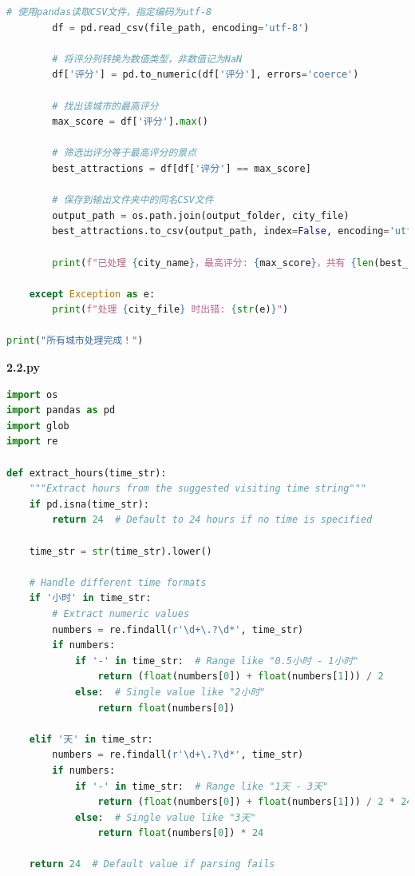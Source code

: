 \documentclass[withoutpreface,bwprint]{cumcmthesis} %
\begin{document}
\begin{appendices}
\begin{lstlisting}[language=python]
        # 使用pandas读取CSV文件，指定编码为utf-8
        df = pd.read_csv(file_path, encoding='utf-8')
        
        # 将评分列转换为数值类型，非数值记为NaN
        df['评分'] = pd.to_numeric(df['评分'], errors='coerce')
        
        # 找出该城市的最高评分
        max_score = df['评分'].max()
        
        # 筛选出评分等于最高评分的景点
        best_attractions = df[df['评分'] == max_score]
        
        # 保存到输出文件夹中的同名CSV文件
        output_path = os.path.join(output_folder, city_file)
        best_attractions.to_csv(output_path, index=False, encoding='utf-8')
        
        print(f"已处理 {city_name}，最高评分: {max_score}，共有 {len(best_attractions)} 个最高评分景点")
    
    except Exception as e:
        print(f"处理 {city_file} 时出错: {str(e)}")

print("所有城市处理完成！")

 \end{lstlisting}




 \textbf{2.2.py}
\begin{lstlisting}[language=python]
import os
import pandas as pd
import glob
import re

def extract_hours(time_str):
    """Extract hours from the suggested visiting time string"""
    if pd.isna(time_str):
        return 24  # Default to 24 hours if no time is specified
    
    time_str = str(time_str).lower()
    
    # Handle different time formats
    if '小时' in time_str:
        # Extract numeric values
        numbers = re.findall(r'\d+\.?\d*', time_str)
        if numbers:
            if '-' in time_str:  # Range like "0.5小时 - 1小时"
                return (float(numbers[0]) + float(numbers[1])) / 2
            else:  # Single value like "2小时"
                return float(numbers[0])
    
    elif '天' in time_str:
        numbers = re.findall(r'\d+\.?\d*', time_str)
        if numbers:
            if '-' in time_str:  # Range like "1天 - 3天"
                return (float(numbers[0]) + float(numbers[1])) / 2 * 24
            else:  # Single value like "3天"
                return float(numbers[0]) * 24
    
    return 24  # Default value if parsing fails


\end{lstlisting}
\end{appendices}
\end{document}
